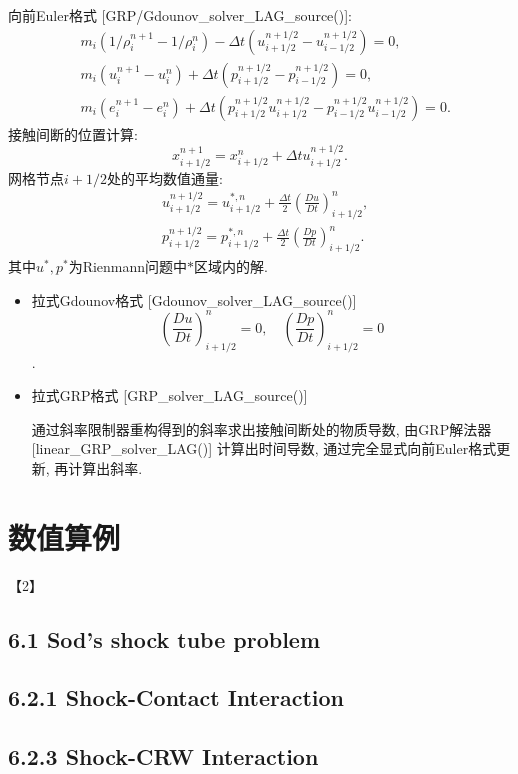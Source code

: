 \documentclass[CJK]{ctexart}
\begin{document}
向前Euler格式 [GRP/Gdounov\_solver\_LAG\_source()]:
\begin{align*}
& m_i(1/\rho_i^{n+1}-1/\rho_i^{n})-\Delta t(u_{i+1/2}^{n+1/2}-u_{i-1/2}^{n+1/2})=0,\\
& m_i(u_i^{n+1}-u_i^{n})+\Delta t(p_{i+1/2}^{n+1/2}-p_{i-1/2}^{n+1/2})=0,\\
& m_i(e_i^{n+1}-e_i^{n})+\Delta t(p_{i+1/2}^{n+1/2} u_{i+1/2}^{n+1/2}-p_{i-1/2}^{n+1/2} u_{i-1/2}^{n+1/2})=0.
\end{align*}
接触间断的位置计算:
$$
x_{i+1/2}^{n+1}=x_{i+1/2}^{n}+\Delta t u_{i+1/2}^{n+1/2}.
$$
网格节点$i+1/2$处的平均数值通量:
\begin{align*}
& u_{i+1/2}^{n+1/2}=u_{i+1/2}^{*,n}+\frac{\Delta t}{2}\left(\frac{D u}{D t}\right)_{i+1/2}^{n}, \\
& p_{i+1/2}^{n+1/2}=p_{i+1/2}^{*,n}+\frac{\Delta t}{2}\left(\frac{D p}{D t}\right)_{i+1/2}^{n}.
\end{align*}
其中$u^{*},p^{*}$为Rienmann问题中$*$区域内的解.

\begin{itemize}
\item 拉式Gdounov格式 [Gdounov\_solver\_LAG\_source()]
$$
\left(\frac{D u}{D t}\right)_{i+1/2}^{n}=0, \quad \left(\frac{D p}{D t}\right)_{i+1/2}^{n}=0
$$. 

\item 拉式GRP格式 [GRP\_solver\_LAG\_source()]

通过斜率限制器重构得到的斜率求出接触间断处的物质导数, 由GRP解法器 [linear\_GRP\_solver\_LAG()] 计算出时间导数, 通过完全显式向前Euler格式更新, 再计算出斜率.
\end{itemize}


\section{数值算例}

【2】

\subsection*{6.1 Sod's shock tube problem}

\subsection*{6.2.1 Shock-Contact Interaction}

\subsection*{6.2.3 Shock-CRW Interaction}
\end{document}

